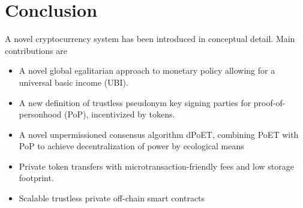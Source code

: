 \documentclass[conference]{IEEEtran}
\begin{document}
\section{Conclusion}
A novel cryptocurrency system has been introduced in conceptual detail. Main contributions are 
\begin{itemize}
	\item A novel global egalitarian approach to monetary policy allowing for a universal basic income (UBI).
	\item A new definition of trustless pseudonym key signing parties for proof-of-personhood (PoP), incentivized by \encointer tokens. 
	\item A novel unpermissioned consensus algorithm dPoET, combining PoET with PoP to achieve decentralization of power by ecological means
	\item Private token transfers with microtransaction-friendly fees and low storage footprint.
	\item Scalable trustless private off-chain smart contracts
\end{itemize}
\end{document}
